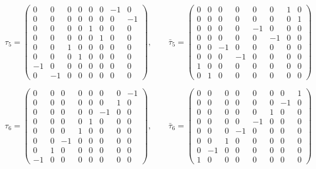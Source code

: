 \documentclass[
  10pt,
]{article}
\begin{document}
\[
\tau_5 = \begin{pmatrix} 0 & 0 & 0 & 0 & 0 & 0 & -1 & 0 \\ 0 & 0 & 0 & 0 & 0 & 0 & 0 & -1 \\ 0 & 0 & 0 & 0 & 1 & 0 & 0 & 0 \\ 0 & 0 & 0 & 0 & 0 & 1 & 0 & 0 \\ 0 & 0 & 1 & 0 & 0 & 0 & 0 & 0 \\ 0 & 0 & 0 & 1 & 0 & 0 & 0 & 0 \\ -1 & 0 & 0 & 0 & 0 & 0 & 0 & 0 \\ 0 & -1 & 0 & 0 & 0 & 0 & 0 & 0 \end{pmatrix},\qquad \bar\tau_5 = \begin{pmatrix} 0 & 0 & 0 & 0 & 0 & 0 & 1 & 0 \\ 0 & 0 & 0 & 0 & 0 & 0 & 0 & 1 \\ 0 & 0 & 0 & 0 & -1 & 0 & 0 & 0 \\ 0 & 0 & 0 & 0 & 0 & -1 & 0 & 0 \\ 0 & 0 & -1 & 0 & 0 & 0 & 0 & 0 \\ 0 & 0 & 0 & -1 & 0 & 0 & 0 & 0 \\ 1 & 0 & 0 & 0 & 0 & 0 & 0 & 0 \\ 0 & 1 & 0 & 0 & 0 & 0 & 0 & 0 \end{pmatrix}
\]

\[
\tau_6 = \begin{pmatrix} 0 & 0 & 0 & 0 & 0 & 0 & 0 & -1 \\ 0 & 0 & 0 & 0 & 0 & 0 & 1 & 0 \\ 0 & 0 & 0 & 0 & 0 & -1 & 0 & 0 \\ 0 & 0 & 0 & 0 & 1 & 0 & 0 & 0 \\ 0 & 0 & 0 & 1 & 0 & 0 & 0 & 0 \\ 0 & 0 & -1 & 0 & 0 & 0 & 0 & 0 \\ 0 & 1 & 0 & 0 & 0 & 0 & 0 & 0 \\ -1 & 0 & 0 & 0 & 0 & 0 & 0 & 0 \end{pmatrix},\qquad \bar\tau_6 = \begin{pmatrix} 0 & 0 & 0 & 0 & 0 & 0 & 0 & 1 \\ 0 & 0 & 0 & 0 & 0 & 0 & -1 & 0 \\ 0 & 0 & 0 & 0 & 0 & 1 & 0 & 0 \\ 0 & 0 & 0 & 0 & -1 & 0 & 0 & 0 \\ 0 & 0 & 0 & -1 & 0 & 0 & 0 & 0 \\ 0 & 0 & 1 & 0 & 0 & 0 & 0 & 0 \\ 0 & -1 & 0 & 0 & 0 & 0 & 0 & 0 \\ 1 & 0 & 0 & 0 & 0 & 0 & 0 & 0 \end{pmatrix}
\]
\end{document}

